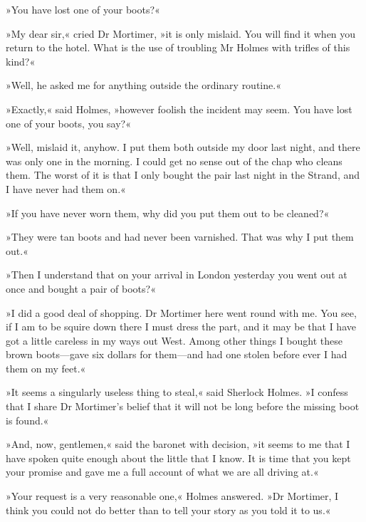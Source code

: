 »You have lost one of your boots?«

»My dear sir,« cried Dr Mortimer, »it is only mislaid. You will find it when you return to the hotel. What is the use of troubling Mr Holmes with trifles of this kind?«

»Well, he asked me for anything outside the ordinary routine.«

»Exactly,« said Holmes, »however foolish the incident may seem. You have lost one of your boots, you say?«

»Well, mislaid it, anyhow. I put them both outside my door last night, and there was only one in the morning. I could get no sense out of the chap who cleans them. The worst of it is that I only bought the pair last night in the Strand, and I have never had them on.«

»If you have never worn them, why did you put them out to be cleaned?«

»They were tan boots and had never been varnished. That was why I put them out.«

»Then I understand that on your arrival in London yesterday you went out at once and bought a pair of boots?«


»I did a good deal of shopping. Dr Mortimer here went round with me. You see, if I am to be squire down there I must dress the part, and it may be that I have got a little careless in my ways out West. Among other things I bought these brown boots—gave six dollars for them—and had one stolen before ever I had them on my feet.«


»It seems a singularly useless thing to steal,« said Sherlock Holmes. »I confess that I share Dr Mortimer's belief that it will not be long before the missing boot is found.«

»And, now, gentlemen,« said the baronet with decision, »it seems to me that I have spoken quite enough about the little that I know. It is time that you kept your promise and gave me a full account of what we are all driving at.«

»Your request is a very reasonable one,« Holmes answered. »Dr Mortimer, I think you could not do better than to tell your story as you told it to us.«

